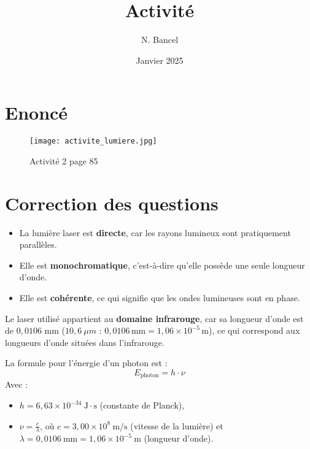 \documentclass[a4paper,12pt]{article}
\begin{document}
\title{Activité}
\author{N. Bancel}
\date{Janvier 2025}
\maketitle

\section*{Enoncé}

\begin{figure}[H]
    \centering
    \texttt{[image: activite\_lumiere.jpg]}
    \captionsetup{labelformat=empty}
    \caption{\label{} Activité 2 page 85}
  \end{figure}

\section*{Correction des questions}

\vspace{1em}
\begin{itemize}[noitemsep]
    \item La lumière laser est \textbf{directe}, car les rayons lumineux sont pratiquement parallèles.
    \item Elle est \textbf{monochromatique}, c'est-à-dire qu'elle possède une seule longueur d'onde.
    \item Elle est \textbf{cohérente}, ce qui signifie que les ondes lumineuses sont en phase.
\end{itemize}

 \par
\vspace{1em}
Le laser utilisé appartient au \textbf{domaine infrarouge}, car sa longueur d'onde est de $0,0106$ mm ($10,6 \ \mu m$ : $0,0106 \, \text{mm} = 1,06 \times 10^{-5} \, \text{m}$), ce qui correspond aux longueurs d'onde situées dans l'infrarouge.

 \par 
\vspace{1em}

La formule pour l'énergie d'un photon est :
\[ E_{\text{photon}} = h \cdot \nu \]
Avec :
\begin{itemize}
    \item $h = 6,63 \times 10^{-34} \ \text{J} \cdot \text{s}$ (constante de Planck),
    \item $\nu = \frac{c}{\lambda}$, où $c = 3,00 \times 10^{8} \ \text{m/s}$ (vitesse de la lumière) et $\lambda = 0,0106 \ \text{mm} = 1,06 \times 10^{-5} \ \text{m}$ (longueur d'onde).
\end{itemize}
\end{document}
